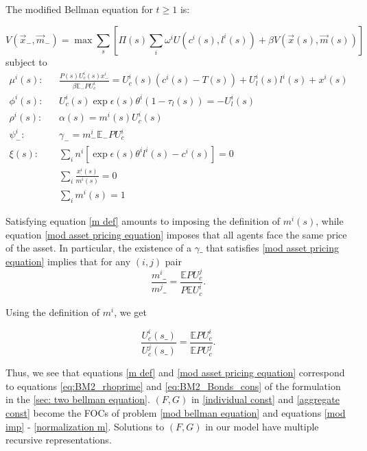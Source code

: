 \documentclass[thmsb,11pt]{article}
\newcommand{\EE}{\mathbb E}
\begin{document}
\noindent The modified Bellman equation for $t\geq 1$ is:



\begin{equation}\label{mod bellman equation}
	V(\vec{x}_-,\vec{m}_{-}) = \max \sum_{s}\left[ \Pi(s) \sum_i \omega^iU(c^i(s),l^i(s)) + \beta V(\vec{x}(s),\vec{m}(s))\right]
\end{equation}
subject to
\begin{align}
\mu^i(s):&&	\frac{P(s)U^i_c(s) x^i_{-} }{\beta\EE_- PU^i_c} = U^i_c(s)(c^i(s)-T(s)) + U^i_l(s) l^i(s) + x^i(s)\\\label{mod imp}
\phi^i(s):&&	U^i_c(s)\exp{\epsilon(s)}\theta^i(1-\tau_l(s)) = -U^i_l(s)\\
\rho^i(s):&&	\alpha(s) = m^i(s) U^i_c(s)\\ \label{m def}
\psi^i_{-}:&&	\gamma_-=  m^i_-\EE_- P U^i_c\\ \label{mod asset pricing equation}
\xi(s):&&	\sum_in^i\left[\exp{\epsilon(s)}\theta^il^i(s) - c^i(s)\right] =0\\
	&&\sum_i \frac{x^i(s)}{m^i(s)} = 0\\
	&&\sum_i m^i(s) = 1 \label{normalization m}
\end{align}


Satisfying equation \eqref{m def}  amounts to imposing the definition of $m^i(s)$,  while equation \eqref{mod asset pricing equation} imposes that all agents face the same  price of the asset. In particular, the existence of a $\gamma\_$ that satisfies \eqref{mod asset pricing equation} implies that for any $(i,j)$ pair
\[\frac{m^i\_}{m^j\_}=\frac{\mathbb{E}P U_c^j}{P \mathbb{E} U^i_c}.\]

\noindent Using the definition of $m^i$, we get

\[\frac{U^i_c(s\_)}{U^j_c(s\_)}=\frac{\mathbb{E}P U_c^i}{\mathbb{E}P U_c^j}.\]

\noindent Thus, we see that  equations \eqref{m def} and \eqref{mod asset pricing equation} correspond to equations \eqref{eq:BM2_rhoprime} and \eqref{eq:BM2_Bonds_cons} of the formulation in the \ref{sec: two bellman equation}.
$\left(F,G\right)$  in \eqref{individual const} and \eqref{aggregate const} become the FOCs of problem \eqref{mod bellman equation} and equations \eqref{mod imp} - \eqref{normalization m}. Solutions to $\left(F,G\right)$ in our model have multiple recursive representations.
\end{document}
